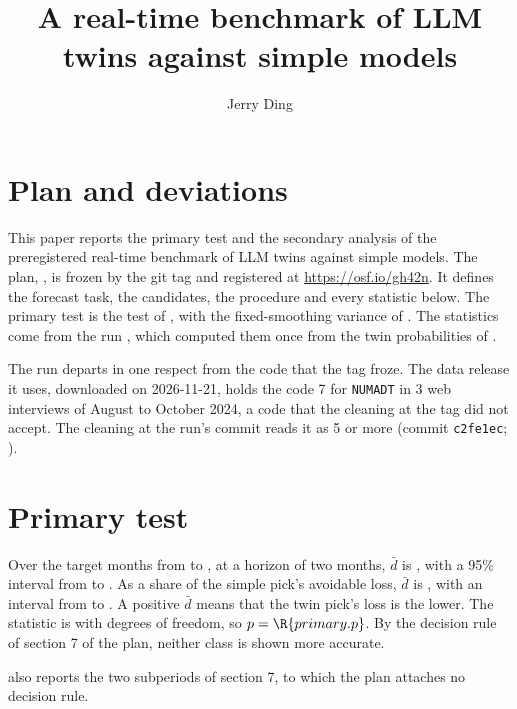 \documentclass{sdt-paper}
\title{A real-time benchmark of LLM twins against simple models}
\author{Jerry Ding}
\begin{document}
\maketitle

\section{Plan and deviations}

This paper reports the primary test and the secondary analysis of the preregistered real-time benchmark of LLM twins
against simple models. The plan, , is frozen by the git tag
 and registered at \url{https://osf.io/gh42n}. It defines the forecast task, the
candidates, the procedure and every statistic below. The primary test is the test of \citet{diebold1995}, with the
fixed-smoothing variance of \citet{coroneo2020}. The statistics come from the run , which computed them once from
the twin probabilities of .

The run departs in one respect from the code that the tag froze. The data release it uses, downloaded on 2026-11-21,
holds the code 7 for \texttt{NUMADT} in 3 web interviews of August to October 2024, a code that the cleaning at the
tag did not accept. The cleaning at the run's commit reads it as 5 or more (commit \texttt{c2fe1ec};
).

\section{Primary test}

Over the  target months from  to , at a horizon of two months,
$\bar d$ is , with a 95\% interval from  to . As a share of the simple
pick's avoidable loss, $\bar d$ is , with an interval from  to
. A positive $\bar d$ means that the twin pick's loss is the lower. The statistic is
 with  degrees of freedom, so $p = \R{primary.p}$. By the decision rule of section 7 of
the plan, neither class is shown more accurate.

 also reports the two subperiods of section 7, to which the plan attaches no decision rule.
\end{document}
